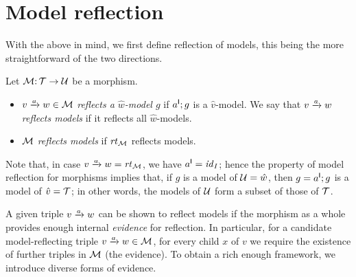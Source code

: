 \section{Model reflection}
\label{sec:reflection}

With the above in mind, we first define reflection of models, this being the more straightforward of the two directions.

\begin{definition}
Let ${\mathcal{M}}{:}\, {\mathcal{T}}\rightarrow{\mathcal{U}}$ be a morphism.
\begin{itemize}[topsep=\itemsep]
\item $\trip vaw\in\cM$ \emph{reflects a $\hat w$-model $g$} if $a^{\mathsf I};g$ is a $\hat v$-model. We say that $\trip vaw$ \emph{reflects models} if it reflects all $\hat w$-models.

\item ${\mathcal{M}}$ \emph{reflects models} if $\mathit{rt}_{{\mathcal{M}}}$ reflects models.
\end{itemize}
\end{definition}
%
Note that, in case $\trip vaw=\rtof\cM$, we have $a^{\mathsf I}={\mathit{id}}_I$; hence the property of model reflection for morphisms implies that, if $g$ is a model of ${\mathcal{U}}=\hat w$, then $g=a^{\mathsf I};g$ is a model of $\hat v={\mathcal{T}}$; in other words, the models of ${\mathcal{U}}$ form a subset of those of ${\mathcal{T}}$.

A given triple $\trip vaw$ can be shown to reflect models if the morphism as a whole provides enough internal \emph{evidence} for reflection. In particular, for a candidate model-reflecting triple $\trip vaw\in \cM$, for every child $x$ of $v$ we require the existence of further triples in ${\mathcal{M}}$ (the evidence). To obtain a rich enough framework, we introduce diverse forms of evidence.

